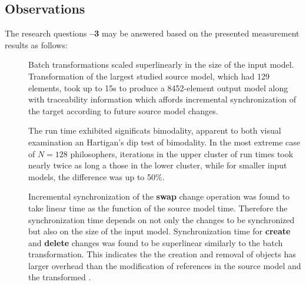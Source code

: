 \subsection{Observations}

The research questions \textbf{--3} may be answered based on the presented measurement results as follows:
\begin{description}
\item[] Batch transformations scaled superlinearly in the size of the input model. Transformation of the largest studied source model, which had 129 elements, took up to 15\thinspace s to produce a 8452-element output model along with traceability information which affords incremental synchronization of the target  according to future source model changes.

  The run time exhibited significats bimodality, apparent to both visual examination an Hartigan's dip test of bimodality. In the most extreme case of \(N = 128\) philosophers, iterations in the upper cluster of run times took nearly twice as long a those in the lower cluster, while for smaller input models, the difference was up to 50\%.
\item[] Incremental synchronization of the \textbf{swap} change operation was found to take linear time as the function of the source model time. Therefore the synchronization time depends on not only the changes to be synchronized but also on the size of the input model. Synchronization time for \textbf{create} and \textbf{delete} changes was found to be superlinear similarly to the batch transformation. This indicates the the creation and removal of objects has larger overhead than the modification of references in the source model and the transformed .


\end{description}
